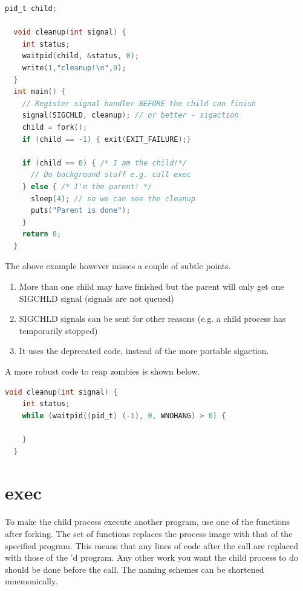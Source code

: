 \begin{itemize}
\begin{lstlisting}[language=C]
  pid_t child;

  void cleanup(int signal) {
    int status;
    waitpid(child, &status, 0);
    write(1,"cleanup!\n",9);
  }
  int main() {
    // Register signal handler BEFORE the child can finish
    signal(SIGCHLD, cleanup); // or better - sigaction
    child = fork();
    if (child == -1) { exit(EXIT_FAILURE);}

    if (child == 0) { /* I am the child!*/
      // Do background stuff e.g. call exec
    } else { /* I'm the parent! */
      sleep(4); // so we can see the cleanup
      puts("Parent is done");
    }
    return 0;
  }
\end{lstlisting}

The above example however misses a couple of subtle points.
\begin{enumerate}
    \item More than one child may have finished but the parent will only get one SIGCHLD signal (signals are not queued)
    \item SIGCHLD signals can be sent for other reasons (e.g. a child process has temporarily stopped)
    \item It uses the deprecated  code, instead of the more portable sigaction.
\end{enumerate}

A more robust code to reap zombies is shown below.

\begin{lstlisting}[language=C]
  void cleanup(int signal) {
    int status;
    while (waitpid((pid_t) (-1), 0, WNOHANG) > 0) {

    }
  }
\end{lstlisting}

\section{exec}

To make the child process execute another program, use one of the \href{http://man7.org/linux/man-pages/man3/exec.3.html}{} functions after forking.
The  set of functions replaces the process image with that of the specified program.
This means that any lines of code after the  call are replaced with those of the 'd program.
Any other work you want the child process to do should be done before the  call.
The naming schemes can be shortened mnemonically.


\end{itemize}
